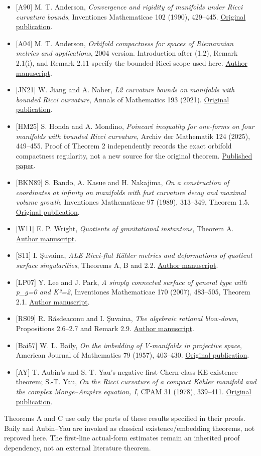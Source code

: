 \documentclass[
  11pt,
]{article}
\providecommand{\tightlist}{%
  \setlength{\itemsep}{0pt}\setlength{\parskip}{0pt}}
\begin{document}
\begin{itemize}
\tightlist
\item
  {[}A90{]} M. T. Anderson, \emph{Convergence and rigidity of manifolds
  under Ricci curvature bounds}, Inventiones Mathematicae 102 (1990),
  429--445. \href{https://doi.org/10.1007/BF01233434}{Original
  publication}.
\item
  {[}A04{]} M. T. Anderson, \emph{Orbifold compactness for spaces of
  Riemannian metrics and applications}, 2004 version. Introduction after
  (1.2), Remark 2.1(i), and Remark 2.11 specify the bounded-Ricci scope
  used here. \href{https://arxiv.org/html/math/0312111}{Author
  manuscript}.
\item
  {[}JN21{]} W. Jiang and A. Naber, \emph{L2 curvature bounds on
  manifolds with bounded Ricci curvature}, Annals of Mathematics 193
  (2021).
  \href{https://annals.math.princeton.edu/2021/193-1/p02}{Original
  publication}.
\item
  {[}HM25{]} S. Honda and A. Mondino, \emph{Poincaré inequality for
  one-forms on four manifolds with bounded Ricci curvature}, Archiv der
  Mathematik 124 (2025), 449--455. Proof of Theorem 2 independently
  records the exact orbifold compactness regularity, not a new source
  for the original theorem.
  \href{https://d-nb.info/1367095026/34}{Published paper}.
\item
  {[}BKN89{]} S. Bando, A. Kasue and H. Nakajima, \emph{On a
  construction of coordinates at infinity on manifolds with fast
  curvature decay and maximal volume growth}, Inventiones Mathematicae
  97 (1989), 313--349, Theorem 1.5.
  \href{https://doi.org/10.1007/BF01389045}{Original publication}.
\item
  {[}W11{]} E. P. Wright, \emph{Quotients of gravitational instantons},
  Theorem A. \href{https://arxiv.org/html/1102.2442}{Author manuscript}.
\item
  {[}S11{]} I. Şuvaina, \emph{ALE Ricci-flat Kähler metrics and
  deformations of quotient surface singularities}, Theorems A, B and
  2.2. \href{https://arxiv.org/html/1102.2672}{Author manuscript}.
\item
  {[}LP07{]} Y. Lee and J. Park, \emph{A simply connected surface of
  general type with p\_g=0 and K²=2}, Inventiones Mathematicae 170
  (2007), 483--505, Theorem 2.1.
  \href{https://arxiv.org/pdf/math/0609072}{Author manuscript}.
\item
  {[}RS09{]} R. Răsdeaconu and I. Şuvaina, \emph{The algebraic rational
  blow-down}, Propositions 2.6--2.7 and Remark 2.9.
  \href{https://math.vanderbilt.edu/rasdear/rbdarxiv.pdf}{Author
  manuscript}.
\item
  {[}Bai57{]} W. L. Baily, \emph{On the imbedding of V-manifolds in
  projective space}, American Journal of Mathematics 79 (1957),
  403--430. \href{https://doi.org/10.2307/2372689}{Original
  publication}.
\item
  {[}AY{]} T. Aubin's and S.-T. Yau's negative first-Chern-class KE
  existence theorem; S.-T. Yau, \emph{On the Ricci curvature of a
  compact Kähler manifold and the complex Monge--Ampère equation, I},
  CPAM 31 (1978), 339--411.
  \href{https://doi.org/10.1002/cpa.3160310304}{Original publication}.
\end{itemize}

Theorems A and C use only the parts of these results specified in their
proofs. Baily and Aubin--Yau are invoked as classical
existence/embedding theorems, not reproved here. The first-line
actual-form estimates remain an inherited proof dependency, not an
external literature theorem.
\end{document}

